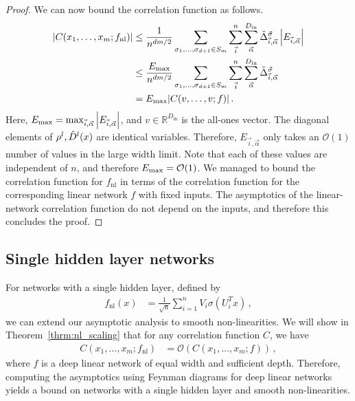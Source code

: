 \documentclass[english]{article}
\newcommand{\bR}{\ensuremath{\mathbb{R}}}
\newcommand{\cO}{\ensuremath{\mathcal{O}}}
\newcommand{\Din}{\ensuremath{D_{\mathrm{in}}}}
\newcommand{\fnl}{f_{\mathrm{nl}}}
\newcommand{\es}[2] {\begin{align} \label{#1} #2 \end{align}}
\begin{document}
\begin{proof}
  We can now bound the correlation function as follows.
  \begin{align}
    |C(x_1,\dots,x_m;\fnl)|
    &\le \frac{1}{n^{dm/2}}
      \sum_{\sigma_1,\dots,\sigma_{d+1} \in S_m} 
      \sum_{\vec{i}}^n \sum_{\vec{\alpha}}^{\Din} \tilde{\Delta}^{\vec{\sigma}}_{\vec{i},\vec{\alpha}}
      \left| E_{\vec{i},\vec{\alpha}} \right|
    \\ &\le
         \frac{E_{\rm max}}{n^{dm/2}}
         \sum_{\sigma_1,\dots,\sigma_{d+1} \in S_m} 
         \sum_{\vec{i}}^n \sum_{\vec{\alpha}}^{\Din} \tilde{\Delta}^{\vec{\sigma}}_{\vec{i},\vec{\alpha}}
    \\ &=
         E_{\rm max} |C(v,\dots,v;f)|
    \,.
  \end{align}
  Here, $E_{\rm max} = \max_{\vec{i},\vec{\alpha}} \left| E_{\vec{i},\vec{\alpha}} \right|$, and $v \in \bR^{\Din}$ is the all-ones vector.
  The diagonal elements of $\rho^l,\hat{D}^l(x)$ are identical variables.
  Therefore, $E_{\vec{i},\vec{\alpha}}$ only takes an $\cO(1)$ number of values in the large width limit.
  Note that each of these values are independent of $n$, and therefore $E_{\rm max} = \mathcal{O}(1)$.
  We managed to bound the correlation function for $\fnl$ in terms of the correlation function for the corresponding linear network $f$ with fixed inputs.
  The asymptotics of the linear-network correlation function do not depend on the inputs, and therefore this concludes the proof.
\end{proof}


\subsection{Single hidden layer networks}

For networks with a single hidden layer, defined by
\es{logit_repeated}{
\fnl(x)&=\frac{1}{\sqrt{n}}\sum_{i=1}^{n}V_{i}\sigma(U_{i}^T x)\,,
}
we can extend our asymptotic analysis to smooth non-linearities.
We will show in Theorem~\ref{thrm:nl_scaling} that for any correlation function $C$, we have
\begin{align}\label{1hl_nl_scaling}
  C(x_1,\dots,x_m;\fnl) &= \cO(C(x_1,\dots,x_m;f)) \,,
\end{align}
where $f$ is a deep linear network of equal width and sufficient depth.
Therefore, computing the asymptotics using Feynman diagrams for deep linear networks yields a bound on networks with a single hidden layer and smooth non-linearities.
\end{document}
